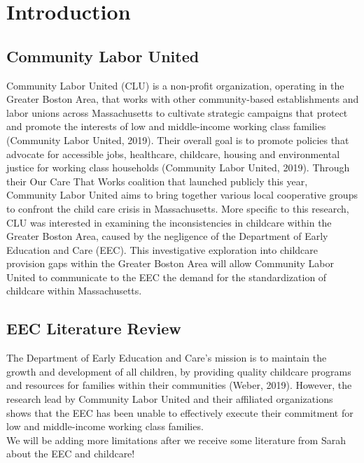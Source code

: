 \documentclass[10pt,letterpaper]{article}
\begin{document}
\linenumbers

\section{Introduction}\label{introduction}

\subsection{Community Labor United}\label{community-labor-united}

Community Labor United (CLU) is a non-profit organization, operating in
the Greater Boston Area, that works with other community-based
establishments and labor unions across Massachusetts to cultivate
strategic campaigns that protect and promote the interests of low and
middle-income working class families (Community Labor United, 2019).
Their overall goal is to promote policies that advocate for accessible
jobs, healthcare, childcare, housing and environmental justice for
working class households (Community Labor United, 2019). Through their
Our Care That Works coalition that launched publicly this year,
Community Labor United aims to bring together various local cooperative
groups to confront the child care crisis in Massachusetts. More specific
to this research, CLU was interested in examining the inconsistencies in
childcare within the Greater Boston Area, caused by the negligence of
the Department of Early Education and Care (EEC). This investigative
exploration into childcare provision gaps within the Greater Boston Area
will allow Community Labor United to communicate to the EEC the demand
for the standardization of childcare within Massachusetts.

\subsection{EEC Literature Review}\label{eec-literature-review}

The Department of Early Education and Care's mission is to maintain the
growth and development of all children, by providing quality childcare
programs and resources for families within their communities (Weber,
2019). However, the research lead by Community Labor United and their
affiliated organizations shows that the EEC has been unable to
effectively execute their commitment for low and middle-income working
class families.\\
We will be adding more limitations after we receive some literature from
Sarah about the EEC and childcare!
\end{document}
